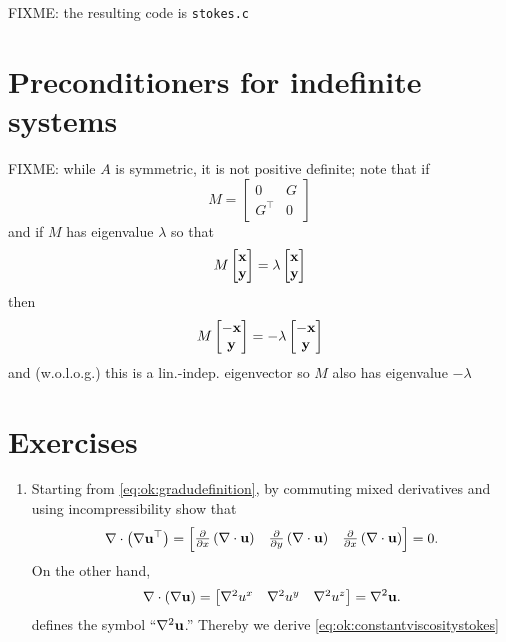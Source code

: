 FIXME: the resulting code is \texttt{stokes.c}


\section{Preconditioners for indefinite systems}

FIXME: while $A$ is symmetric, it is not positive definite; note that if
    $$M = \begin{bmatrix} 0 & G \\ G^\top & 0 \end{bmatrix}$$
and if $M$ has eigenvalue $\lambda$ so that
    $$M \begin{bmatrix} \mathbf{x} \\ \mathbf{y} \end{bmatrix} = \lambda \begin{bmatrix} \mathbf{x} \\ \mathbf{y} \end{bmatrix}$$
then
    $$M \begin{bmatrix} -\mathbf{x} \\ \mathbf{y} \end{bmatrix} = - \lambda \begin{bmatrix} -\mathbf{x} \\ \mathbf{y} \end{bmatrix}$$
and (w.o.l.o.g.) this is a lin.-indep. eigenvector so $M$ also has eigenvalue $-\lambda$


\section{Exercises}

\renewcommand{\labelenumi}{\arabic{chapter}.\arabic{enumi}\quad}
\begin{enumerate}
\item \label{exer:ok:constantviscositystokes}  Starting from \eqref{eq:ok:gradudefinition}, by commuting mixed derivatives and using incompressibility show that
\begin{equation*}
\nabla\cdot \left(\nabla \mathbf{u}^{\top}\right) = \begin{bmatrix}
    \frac{\partial}{\partial x}\left(\nabla\cdot \mathbf{u}\right) & \frac{\partial}{\partial y }\left(\nabla\cdot \mathbf{u}\right) & \frac{\partial}{\partial x} \left(\nabla\cdot \mathbf{u}\right)
    \end{bmatrix}
    = 0.
\end{equation*}
On the other hand,
\begin{equation*}
\nabla\cdot \left(\nabla \mathbf{u}\right) = \begin{bmatrix} \nabla^2 u^x & \nabla^2 u^y & \nabla^2 u^z \end{bmatrix} = \nabla^2 \mathbf{u}.
\end{equation*}
defines the symbol ``$\nabla^2 \mathbf{u}$.''  Thereby we derive \eqref{eq:ok:constantviscositystokes}
\end{enumerate}

